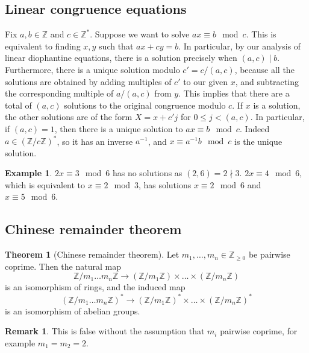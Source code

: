 \documentclass{article}
\newcommand{\Z}{\mathbb{Z}}
\newcommand{\rb}[1]{\left( #1 \right)}
\theoremstyle{definition}\newtheorem{definition}{Definition}
\theoremstyle{definition}\newtheorem*{remark}{Remark}
\theoremstyle{definition}\newtheorem*{example}{Example}
\theoremstyle{definition}\newtheorem*{note}{Note}
\newtheorem{theorem}[definition]{Theorem}
\begin{document}

\subsection{Linear congruence equations}

Fix $ a, b \in \Z $ and $ c \in \Z^* $. Suppose we want to solve $ ax \equiv b \mod c $. This is equivalent to finding $ x, y $ such that $ ax + cy = b $. In particular, by our analysis of linear diophantine equations, there is a solution precisely when $ \rb{a, c} \mid b $. Furthermore, there is a unique solution modulo $ c' = c / \rb{a, c} $, because all the solutions are obtained by adding multiples of $ c' $ to our given $ x $, and subtracting the corresponding multiple of $ a / \rb{a, c} $ from $ y $. This implies that there are a total of $ \rb{a, c} $ solutions to the original congruence modulo $ c $. If $ x $ is a solution, the other solutions are of the form $ X = x + c'j $ for $ 0 \le j < \rb{a, c} $. In particular, if $ \rb{a, c} = 1 $, then there is a unique solution to $ ax \equiv b \mod c $. Indeed $ a \in \rb{\Z / c\Z}^* $, so it has an inverse $ a^{-1} $, and $ x \equiv a^{-1}b \mod c $ is the unique solution.

\begin{example}
$ 2x \equiv 3 \mod 6 $ has no solutions as $ \rb{2, 6} = 2 \nmid 3 $. $ 2x \equiv 4 \mod 6 $, which is equivalent to $ x \equiv 2 \mod 3 $, has solutions $ x \equiv 2 \mod 6 $ and $ x \equiv 5 \mod 6 $.
\end{example}

\subsection{Chinese remainder theorem}

\begin{theorem}[Chinese remainder theorem]
Let $ m_1, \dots, m_n \in \Z_{\ge 0} $ be pairwise coprime. Then the natural map
$$ \Z / m_1 \dots m_n\Z \to \rb{\Z / m_1\Z} \times \dots \times \rb{\Z / m_n\Z} $$
is an isomorphism of rings, and the induced map
$$ \rb{\Z / m_1 \dots m_n\Z}^* \to \rb{\Z / m_1\Z}^* \times \dots \times \rb{\Z / m_n\Z}^* $$
is an isomorphism of abelian groups.
\end{theorem}

\begin{remark}
This is false without the assumption that $ m_i $ pairwise coprime, for example $ m_1 = m_2 = 2 $.
\end{remark}
\end{document}
